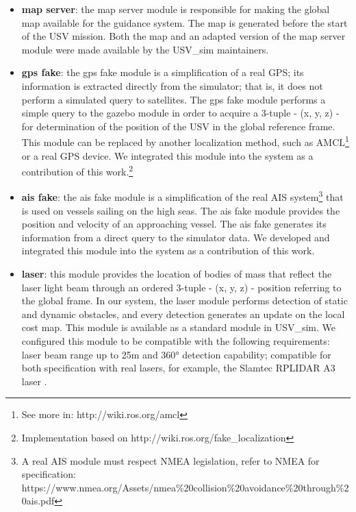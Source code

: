     \begin{itemize}
    
        \item \textbf{map server}: the map server module is responsible for making the global map available for the guidance system. The map is generated before the start of the \ac{USV} mission. Both the map and an adapted version of the map server module were made available by the USV\_sim maintainers.
    
        \item \textbf{gps fake}: the gps fake module is a simplification of a real GPS; its information is extracted directly from the simulator; that is, it does not perform a simulated query to satellites. The gps fake module performs a simple query to the gazebo module in order to acquire a 3-tuple - (x, y, z) - for determination of the position of the \ac{USV} in the global reference frame. This module can be replaced by another localization method, such as \ac{AMCL}\footnote{See more in: http://wiki.ros.org/amcl} or a real GPS device. We integrated this module into the system as a contribution of this work.\footnote{Implementation based on http://wiki.ros.org/fake\_localization}
    
        \item \textbf{ais fake}: the ais fake module is a simplification of the real AIS system\footnote{A real AIS module must respect NMEA legislation, refer to NMEA for specification: https://www.nmea.org/Assets/nmea\%20collision\%20avoidance\%20through\%20ais.pdf} that is used on vessels sailing on the high seas. The ais fake module provides the position and velocity of an approaching vessel. The ais fake generates its information from a direct query to the simulator data. We developed and integrated this module into the system as a contribution of this work.
    
        \item \textbf{laser}: this module provides the location of bodies of mass that reflect the laser light beam through an ordered 3-tuple - (x, y, z) - position referring to the global frame. In our system, the laser module performs detection of static and dynamic obstacles, and every detection generates an update on the local cost map. This module is available as a standard module in USV\_sim. We configured this module to be compatible with the following requirements: laser beam range up to 25m and 360° detection capability; compatible for both specification with real lasers, for example, the Slamtec RPLIDAR A3 laser \cite{RPLidarA3}.
    
    \end{itemize}
    
